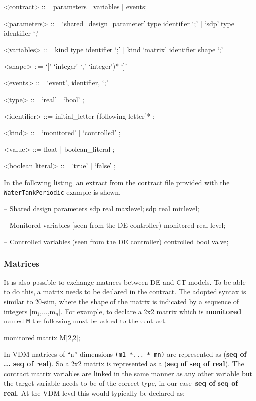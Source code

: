 \documentclass{crescendorepchap}
\newcommand{\vdmkeyw}[1]{{\bf\ttfamily #1}}
\begin{document}
\begin{grammar}
<contract> ::= parameters | variables | events;

<parameters> ::= `shared\_design\_parameter' type identifier `;'
             |   `sdp' type identifier `;'

<variables> ::= kind type identifier `;' 
            |   kind `matrix' identifier shape `;'

<shape> ::= `[' `integer' `,' `integer')* `]' 

<events> ::= `event', identifier, `;'

<type> ::= `real' | `bool' ;

<identifier> ::= initial\_letter (following letter)* ;

<kind> ::= `monitored' | `controlled' ;

<value> ::= float | boolean\_literal ;

<boolean literal> ::= `true' | `false' ;
\end{grammar}

In the following listing, an extract from the contract file provided
with the \texttt{WaterTankPeriodic} example is shown.

\begin{dcl}
-- Shared design parameters
sdp real maxlevel;
sdp real minlevel; 

-- Monitored variables (seen from the DE controller)
monitored real level;

-- Controlled variables (seen from the DE controller)
controlled bool valve; 
\end{dcl}

\subsubsection{Matrices}

It is also possible to exchange matrices
between DE and CT models. To be able to do this, a matrix needs to be
declared in the contract. The adopted syntax is similar to 20-sim, where
the shape of the matrix is indicated by a sequence of integers
{[}m$_1$,...,m$_n${]}. For example, to declare
a 2x2 matrix which is \vdmkeyw{monitored} named \texttt{M} the following must be
added to the contract:

\begin{dcl}
monitored matrix M[2,2];
\end{dcl}

In VDM matrices of ``n'' dimensions
\texttt{(m1 *... * mn)} are
represented as (\vdmkeyw{seq of ... seq of real}). So a 2x2 matrix is
represented as a (\vdmkeyw{seq of seq of
real}).
The contract matrix variables are linked in the same manner as any other
variable but the target variable needs to be of the correct type, in our
case~\vdmkeyw{seq of seq of real}. At the VDM level this would typically 
be declared as:
\end{document}
